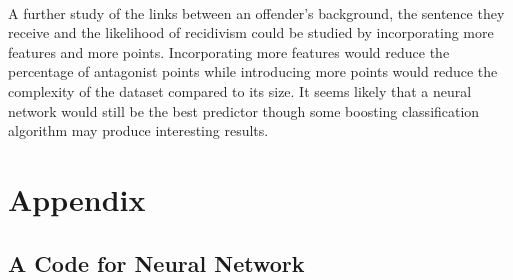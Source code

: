\documentclass[a4paper]{article}
\theoremstyle{plain}
\begin{document}
\paragraph{}
A further study of the links between an offender's background, the sentence they receive and the likelihood of recidivism could be studied by incorporating more features and more points. Incorporating more features would reduce the percentage of antagonist points while introducing more points would reduce the complexity of the dataset compared to its size. It seems likely that a neural network would still be the best predictor though some boosting classification algorithm may produce interesting results.

\newpage

\nocite{*}



\newpage
\appendix

\section*{Appendix}
\subsection*{A Code for Neural Network}
\end{document}
